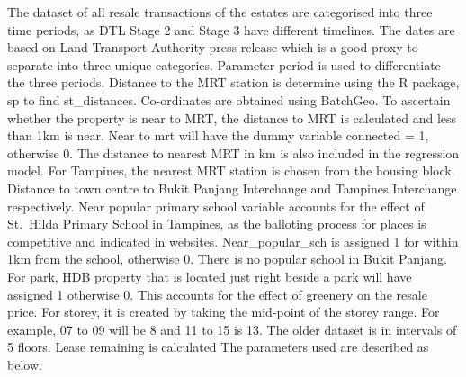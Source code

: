 \documentclass[]{book}
\begin{document}
The dataset of all resale transactions of the estates are categorised
into three time periods, as DTL Stage 2 and Stage 3 have different
timelines. The dates are based on Land Transport Authority press release
which is a good proxy to separate into three unique categories.
Parameter period is used to differentiate the three periods. Distance to
the MRT station is determine using the R package, sp to find
st\_distances. Co-ordinates are obtained using BatchGeo. To ascertain
whether the property is near to MRT, the distance to MRT is calculated
and less than 1km is near. Near to mrt will have the dummy variable
connected = 1, otherwise 0. The distance to nearest MRT in km is also
included in the regression model. For Tampines, the nearest MRT station
is chosen from the housing block. Distance to town centre to Bukit
Panjang Interchange and Tampines Interchange respectively. Near popular
primary school variable accounts for the effect of St.~Hilda Primary
School in Tampines, as the balloting process for places is competitive
and indicated in websites. Near\_popular\_sch is assigned 1 for within
1km from the school, otherwise 0. There is no popular school in Bukit
Panjang. For park, HDB property that is located just right beside a park
will have assigned 1 otherwise 0. This accounts for the effect of
greenery on the resale price. For storey, it is created by taking the
mid-point of the storey range. For example, 07 to 09 will be 8 and 11 to
15 is 13. The older dataset is in intervals of 5 floors. Lease remaining
is calculated The parameters used are described as below.
\end{document}
